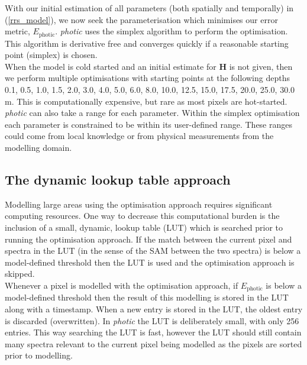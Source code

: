 \documentclass[12pt]{article}
\numberwithin{equation}{section}
\begin{document}
With our initial estimation of all parameters (both spatially and temporally) in (\ref{rrs_model}), we 
now seek the parameterisation which minimises our error metric, $E_{\text{photic}}$. \textit{photic} 
uses the simplex algorithm \cite{oneil1971} to perform the optimisation. This algorithm is 
derivative free and converges quickly if a reasonable starting point (simplex) is chosen. \\

When the model is cold started and an initial estimate for \textbf{H} is not given, then we perform 
multiple optimisations with starting points at the following depths 0.1, 0.5, 1.0, 1.5, 2.0, 3.0, 
4.0, 5.0, 6.0, 8.0, 10.0, 12.5, 15.0, 17.5, 20.0, 25.0, 30.0 m. This is computationally expensive, 
but rare as most pixels are hot-started. \\

\textit{photic} can also take a range for each parameter. Within the simplex optimisation each 
parameter is constrained to be within its user-defined range. These ranges could come from 
local knowledge or from physical measurements from the modelling domain. 

	\subsection{The dynamic lookup table approach}

Modelling large areas using the optimisation approach requires significant computing resources. 
One way to decrease this computational burden is the inclusion of a small, dynamic, lookup table 
(LUT) which is searched prior to running the optimisation approach. If the match between the 
current pixel and spectra in the LUT (in the sense of the SAM between the two spectra) is 
below a model-defined threshold then the LUT is used and the optimisation approach is skipped. \\

Whenever a pixel is modelled with the optimisation approach, if $E_{\text{photic}}$ is below a 
model-defined threshold then the result of this modelling is stored in the LUT along with a 
timestamp. When a new entry is stored in the LUT, the oldest entry is discarded (overwritten). 
In \textit{photic} the LUT is deliberately small, with only 256 entries. This way searching 
the LUT is fast, however the LUT should still contain many spectra relevant to the current 
pixel being modelled as the pixels are sorted prior to modelling. \\
\end{document}
